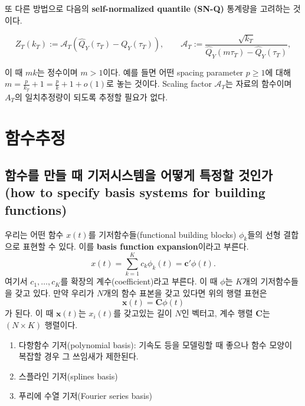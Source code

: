 \documentclass[b5paper,]{scrbook}
\theoremstyle{plain}
\theoremstyle{definition}
\numberwithin{equation}{section}
\begin{document}
또 다른 방법으로 다음의 \textbf{self-normalized quantile (SN-Q)} 통계량을 고려하는 것이다.

\begin{equation}
Z_{T}(k_{T}):= \mathcal{A}_{T}(\hat{Q}_{Y}(\tau_{T}) - Q_{Y}(\tau_{T})), \qquad{\mathcal{A}_{T}:=\frac{\sqrt{k_{T}}}{\hat{Q}_{Y}(m\tau_{T})- \hat{Q}_{Y}(\tau_{T}) }  ,}
\label{eq:SNQ}
\end{equation}

이 때 \(mk\)는 정수이며 \(m>1\)이다. 예를 들면 어떤 spacing parameter \(p\geq 1\)에 대해 \(m= \frac{p}{k_{T}}+1 = \frac{p}{k}+1 + o(1)\)로 놓는 것이다. Scaling factor \(\mathcal{A}_{T}\)는 자료의 함수이며 \(A_{T}\)의 일치추정량이 되도록 추정할 필요가 없다.

\hypertarget{functionestimation}{%
\chapter{함수추정}\label{functionestimation}}

\hypertarget{------how-to-specify-basis-systems-for-building-functions}{%
\section{함수를 만들 때 기저시스템을 어떻게 특정할 것인가(how to specify basis systems for building functions)}\label{------how-to-specify-basis-systems-for-building-functions}}

우리는 어떤 함수 \(x(t)\)를 기저함수들(functional building blocks) \(\phi_{k}\)들의 선형 결합으로 표현할 수 있다. 이를 \textbf{basis function expansion}이라고 부른다.
\[x(t)=\sum_{k=1}^{K}c_{k}\phi_{k}(t)=\mathbf{c}'\phi(t).\]
여기서 \(c_{1},\ldots, c_{K}\)를 확장의 계수(coefficient)라고 부른다. 이 때 \(\phi\)는 \(K\)개의 기저함수들을 갖고 있다. 만약 우리가 \(N\)개의 함수 표본을 갖고 있다면 위의 행렬 표현은
\[\mathbf{x}(t)=\mathbf{C}\phi(t)\]
가 된다. 이 때 \(\mathbf{x}(t)\)는 \(x_{i}(t)\)를 갖고있는 길이 \(N\)인 벡터고, 계수 행렬 \(\mathbf{C}\)는 \((N\times K)\) 행렬이다.

\begin{enumerate}
\def\labelenumi{\arabic{enumi}.}
\item
  다항함수 기저(polynomial basis): 기속도 등을 모델링할 때 좋으나 함수 모양이 복잡할 경우 그 쓰임새가 제한된다.
\item
  스플라인 기저(splines basis)
\item
  푸리에 수열 기저(Fourier series basis)
\end{enumerate}
\end{document}
